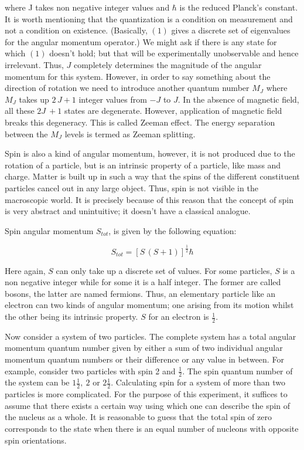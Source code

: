 		where J takes non negative integer values and $\hbar$ is the reduced
		Planck's constant. It is worth mentioning that the quantization is
		a condition on measurement and not a condition on existence. (Basically,
		$(1)$ gives a discrete set of eigenvalues for the angular momentum
		operator.) We might ask if there is any state for which $(1)$ doesn't
		hold; but that will be experimentally unobservable and hence irrelevant.
		Thus, $J$ completely determines the magnitude of the angular momentum
		for this system. However, in order to say something about the direction
		of rotation we need to introduce another quantum number $M_{J}$ where
		$M_{J}$ takes up $2\, J+1$ integer values from $-J$ to $J.$ In
		the absence of magnetic field, all these $2J\ +1$ states are degenerate.
		However, application of magnetic field breaks this degeneracy. This
		is called Zeeman effect. The energy separation between the $M_{J}$
		levels is termed as Zeeman splitting.

		Spin is also a kind of angular momentum, however, it is not produced
		due to the rotation of a particle, but is an intrinsic property of
		a particle, like mass and charge. Matter is built up in such a way
		that the spins of the different constituent particles cancel out in
		any large object. Thus, spin is not visible in the macroscopic world.
		It is precisely because of this reason that the concept of spin is
		very abstract and unintuitive; it doesn't have a classical analogue. 

		Spin angular momentum $S_{tot}$, is given by the following equation:

		\begin{equation}
		S_{tot}=[S\,(S+1)]^{\frac{1}{2}}\hbar
		\end{equation}


		Here again, $S$ can only take up a discrete set of values. For some
		particles, $S$ is a non negative integer while for some it is a half
		integer. The former are called bosons, the latter are named fermions.
		Thus, an elementary particle like an electron can two kinds of angular
		momentum; one arising from its motion whilst the other being its intrinsic
		property. $S$ for an electron is $\frac{1}{2}.$ 

		Now consider a system of two particles. The complete system has a
		total angular momentum quantum number given by either a sum of two
		individual angular momentum quantum numbers or their difference or
		any value in between. For example, consider two particles with spin
		2 and $\frac{1}{2}.$ The spin quantum number of the system can be
		$1\frac{1}{2},\ 2$ or $2\frac{1}{2}.$ Calculating spin for a system
		of more than two particles is more complicated. For the purpose of
		this experiment, it suffices to assume that there exists a certain
		way using which one can describe the spin of the nucleus as a whole.
		It is reasonable to guess that the total spin of zero corresponds
		to the state when there is an equal number of nucleons with opposite
		spin orientations. 


